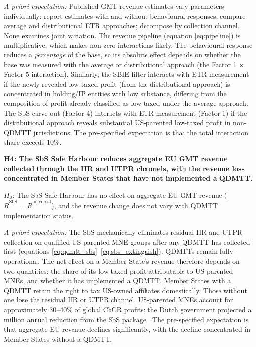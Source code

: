 \documentclass[11pt,a4paper]{article}
\newcommand{\EUR}{\texteuro}
\begin{document}
\textit{A-priori expectation:} Published GMT revenue estimates vary parameters individually: \citet{barake2022} report estimates with and without behavioural responses; \citet{hugger2026} compare average and distributional ETR approaches; \citet{boukal2026} decompose by collection channel. None examines joint variation. The revenue pipeline (equation \ref{eq:pipeline}) is multiplicative, which makes non-zero interactions likely. The behavioural response reduces a \emph{percentage} of the base, so its absolute effect depends on whether the base was measured with the average or distributional approach (the Factor 1 $\times$ Factor 5 interaction). Similarly, the SBIE filter interacts with ETR measurement if the newly revealed low-taxed profit (from the distributional approach) is concentrated in holding/IP entities with low substance, differing from the composition of profit already classified as low-taxed under the average approach. The SbS carve-out (Factor 4) interacts with ETR measurement (Factor 1) if the distributional approach reveals substantial US-parented low-taxed profit in non-QDMTT jurisdictions. The pre-specified expectation is that the total interaction share exceeds 10\%.

\textbf{H4: The SbS Safe Harbour reduces aggregate EU GMT revenue collected through the IIR and UTPR channels, with the revenue loss concentrated in Member States that have not implemented a QDMTT.}

$H_0$: The SbS Safe Harbour has no effect on aggregate EU GMT revenue ($\bar{R}^{\text{SbS}} = \bar{R}^{\text{universal}}$), and the revenue change does not vary with QDMTT implementation status.

\textit{A-priori expectation:} The SbS mechanically eliminates residual IIR and UTPR collection on qualified US-parented MNE groups after any QDMTT has collected first (equations \ref{eq:qdmtt_sbs}--\ref{eq:sbs_extinguish}). QDMTTs remain fully operational. The net effect on a Member State's revenue therefore depends on two quantities: the share of its low-taxed profit attributable to US-parented MNEs, and whether it has implemented a QDMTT. Member States with a QDMTT retain the right to tax US-owned affiliates domestically. Those without one lose the residual IIR or UTPR channel. US-parented MNEs account for approximately 30--40\% of global CbCR profits; the Dutch government projected a \EUR120 million annual reduction from the SbS package \citep{1028}. The pre-specified expectation is that aggregate EU revenue declines significantly, with the decline concentrated in Member States without a QDMTT.
\end{document}
